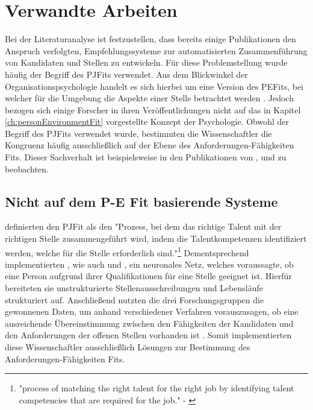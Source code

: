 \chapter{Verwandte Arbeiten}
\label{ch:verwandteArbeiten}
Bei der Literaturanalyse ist festzustellen, dass bereits einige Publikationen den Anspruch verfolgten, Empfehlungssysteme zur automatisierten Zusammenführung von Kandidaten und Stellen zu entwickeln. Für diese Problemstellung wurde häufig der Begriff des \acp{PJFit} verwendet. Aus dem Blickwinkel der Organisationspsychologie handelt es sich hierbei um eine Version des \acp{PEFit}, bei welcher für die Umgebung die Aspekte einer Stelle betrachtet werden \cite[S. 1ff.]{edwards:1991}\cite[S. 3]{malinowski:2006}. Jedoch bezogen sich einige Forscher in ihren Veröffentlichungen nicht auf das in Kapitel \ref{ch:personEnvironmentFit} vorgestellte Konzept der Psychologie. Obwohl der Begriff des \acp{PJFit} verwendet wurde, bestimmten die Wissenschaftler die Kongruenz häufig ausschließlich auf der Ebene des Anforderungen-Fähigkeiten Fits. Dieser Sachverhalt ist beispielsweise in den Publikationen von \textcite[S. 1ff.]{luo:2019}, \textcite[S. 1ff.]{qin:2018} und \textcite[S. 1ff.]{personJobFit:2018} zu beobachten.

\section{Nicht auf dem P-E Fit basierende Systeme}
\label{ch:verwandteArbeiten:nichtAufDemPEFitBasierend}
\textcite[S. 1, Z. 1f.]{personJobFit:2018} definierten den \ac{PJFit} als den "Prozess, bei dem das richtige Talent mit der richtigen Stelle zusammengeführt wird, indem die Talentkompetenzen identifiziert werden, welche für die Stelle erforderlich sind."\footnote{"process of matching the right talent for the right job by identifying talent competencies that are required for the job." - \textcite[S. 1, Z. 1f.]{personJobFit:2018}} Dementsprechend implementierten \textcite[S. 1ff.]{personJobFit:2018}, wie auch \textcite[S. 1ff.]{luo:2019} und \textcite[S. 1ff.]{qin:2018}, ein neuronales Netz, welches voraussagte, ob eine Person aufgrund ihrer Qualifikationen für eine Stelle geeignet ist. Hierfür bereiteten sie unstrukturierte Stellenausschreibungen und Lebensläufe strukturiert auf. Anschließend nutzten die drei Forschungsgruppen die gewonnenen Daten, um anhand verschiedener Verfahren vorauszusagen, ob eine ausreichende Übereinstimmung zwischen den Fähigkeiten der Kandidaten und den Anforderungen der offenen Stellen vorhanden ist \cite[S. 1ff.]{luo:2019}\cite[S. 1ff.]{qin:2018}\cite[S. 1ff.]{personJobFit:2018}. Somit implementierten diese Wissenschaftler ausschließlich Lösungen zur Bestimmung des Anforderungen-Fähigkeiten Fits.

